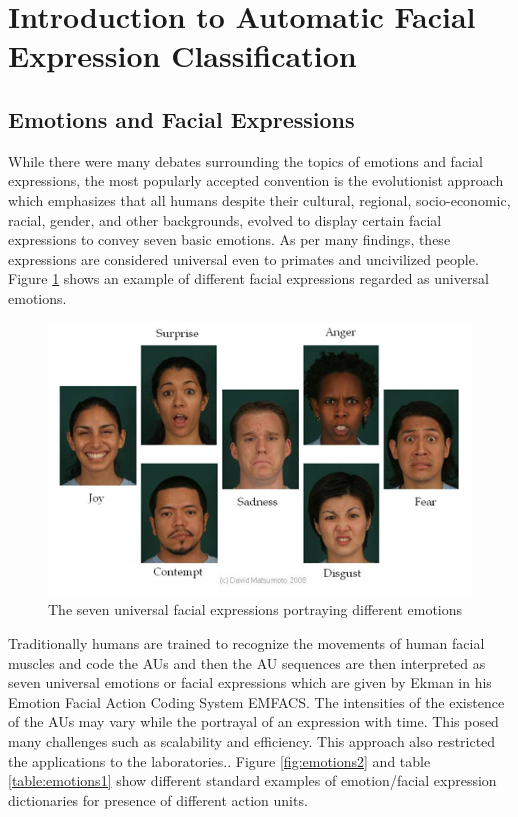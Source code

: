\section{Introduction to Automatic Facial Expression Classification}


\subsection{Emotions and Facial Expressions}
While there were many debates surrounding the topics of emotions and facial expressions, the most popularly accepted convention is the evolutionist approach which emphasizes that all humans despite their cultural, regional, socio-economic, racial, gender, and other backgrounds, evolved to display certain facial expressions to convey seven basic emotions. As per many findings\cite{book1, ekmanwebsite, emfacsWiki}, these expressions are considered universal even to primates and uncivilized people. Figure \ref{fig:emotions1} shows an example of different facial expressions regarded as universal emotions.

\begin{figure}
  \includegraphics[width=\linewidth]{seven_emotions.jpg}
  \caption{The seven universal facial expressions portraying different emotions\cite{fig1}}
  \label{fig:emotions1}
\end{figure}


 Traditionally humans are trained to recognize the movements of human facial muscles and code the AUs and then the AU sequences are then interpreted as seven universal emotions or facial expressions which are given by Ekman in his Emotion Facial Action Coding System EMFACS\cite{emfacs}. The intensities of the existence of the AUs may vary while the portrayal of an expression with time. This posed many challenges such as scalability and efficiency. This approach also restricted the applications to the laboratories.\cite{survey3}. Figure \ref{fig:emotions2} and table \ref{table:emotions1} show different standard examples of emotion/facial expression dictionaries for presence of different action units.


